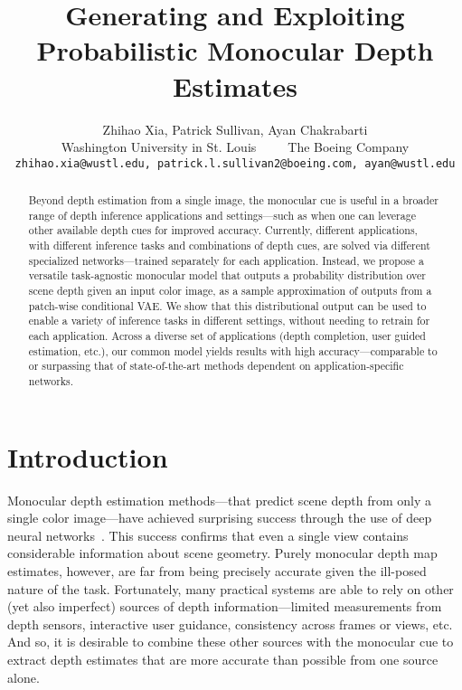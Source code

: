 \documentclass[10pt,twocolumn,letterpaper]{article}
\begin{document}
\title{Generating and Exploiting Probabilistic Monocular Depth Estimates}

\author{Zhihao Xia, Patrick Sullivan, Ayan Chakrabarti\\
  Washington University in St. Louis~~~~~The Boeing Company\\
  {\tt\small zhihao.xia@wustl.edu, patrick.l.sullivan2@boeing.com, ayan@wustl.edu}
}

\maketitle

\begin{abstract}
  Beyond depth estimation from a single image, the monocular cue is useful in a broader range of depth inference applications and settings---such as when one can leverage other available depth cues for improved accuracy. Currently, different applications, with different inference tasks and combinations of depth cues, are solved via different specialized networks---trained separately for each application. Instead, we propose a versatile task-agnostic monocular model that outputs a probability distribution over scene depth given an input color image, as a sample approximation of outputs from a patch-wise conditional VAE. We show that this distributional output can be used to enable a variety of inference tasks in different settings, without needing to retrain for each application. Across a diverse set of applications (depth completion, user guided estimation, etc.), our common model yields results with high accuracy---comparable to or surpassing that of state-of-the-art methods dependent on application-specific networks.
\end{abstract}

\section{Introduction}
\label{sec:intro}

Monocular depth estimation methods---that predict scene depth from only a single color image---have achieved surprising success through the use of deep neural networks~\cite{eigen2015predicting, wang2015towards, chakrabarti2016depth, fu2018deep, laina2016deeper}. This success confirms that even a single view contains considerable information about scene geometry. Purely monocular depth map estimates, however, are far from being precisely accurate given the ill-posed nature of the task. Fortunately, many practical systems are able to rely on other (yet also imperfect) sources of depth information---limited measurements from depth sensors, interactive user guidance, consistency across frames or views, etc. And so, it is desirable to combine these other sources with the monocular cue to extract depth estimates that are more accurate than possible from one source alone.
\end{document}
